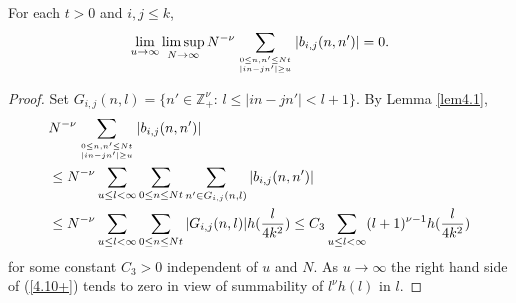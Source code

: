 \begin{lemma}\label{lem4.3}  For each $t >0$ and $i,j\leq k$,
\[
\lim_{ u \to \infty} \limsup_{N\to\infty}N^{-\nu}\sum_{0\le n,n' \le Nt
\atop |in-jn'|\ge u}|b_{i,j}(n,n')|=0.
\]
\end{lemma}
\begin{proof}
Set $G_{i,j}(n,l)=\{ n'\in{{\mathbb Z}}^\nu_+:\, l\leq |in-jn'|<l+1\}$. By 
Lemma \ref{lem4.1},
\begin{eqnarray}\label{4.10+}
&N^{-\nu}\sum_{0\leq n,n'\leq Nt\atop |in-jn'|\ge u}|b_{i,j}(n,n')|\\
&\leq N^{-\nu}\sum_{u\leq l<\infty}\sum_{0\leq n\leq Nt}\sum_{n'\in G_{i,j}
(n,l)}|b_{i,j}(n,n')|\nonumber\\
&\leq N^{-\nu}\sum_{u\leq l<\infty}\sum_{0\leq n\leq Nt}
|G_{i,j}(n,l)|h(\frac l{4k^2})\leq C_3\sum_{u\leq l<\infty}(l+1)^{\nu-1}
h(\frac l{4k^2})\nonumber
\end{eqnarray}
for some constant $C_3>0$ independent of $u$ and $N$.
As $u\to\infty$ the right hand side of (\ref{4.10+}) tends to zero in view
of summability of $l^{\nu}h(l)$ in $l$.
\end{proof}

